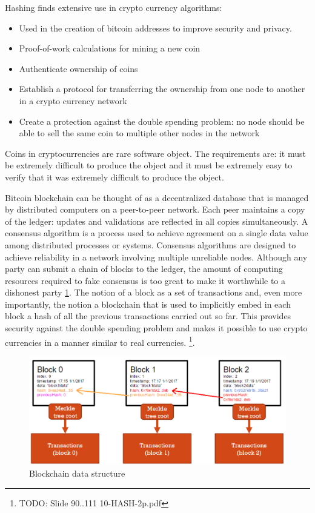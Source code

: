 Hashing finds extensive use in crypto currency algorithms:
\begin{itemize}
	\item Used in the creation of bitcoin addresses to improve security and privacy.
	\item Proof-of-work calculations for mining a new coin
	\item Authenticate ownership of coins
	\item Establish a protocol for transferring the ownership from one node to another in a crypto currency network
	\item Create a protection against the double spending problem: no node should be able to sell the same coin to multiple other nodes in the network
\end{itemize}

Coins in cryptocurrencies are rare software object. The requirements are:
it must be extremely difficult to produce the object and it must be extremely easy to verify that it was extremely difficult to produce the object.

Bitcoin blockchain can be thought of as a decentralized database that is managed by distributed computers on a peer-to-peer network. Each peer maintains a copy of the ledger: updates and validations are reflected in all copies simultaneously.  A consensus algorithm is a process used to achieve agreement on a single data value among distributed processes or systems. Consensus algorithms are designed to achieve reliability in a network involving multiple unreliable nodes. Although any party can submit a chain of blocks to the ledger, the amount of computing resources required to fake consensus is too great to make it worthwhile to a dishonest party \ref{fig:blockchain}. 
The notion of a block as a set of transactions and, even more importantly, the notion a blockchain that is used to implicitly embed in each block a hash of all the previous transactions carried out so far. This provides security against the double spending problem and makes it possible to use crypto currencies in a manner similar to real currencies.  \footnote{TODO: Slide 90..111 10-HASH-2p.pdf}.

\begin{figure}
	\centering
	\includegraphics[width=0.7\linewidth]{Images/Chapter6/blockchain}
	\caption{Blockchain data structure}
	\label{fig:blockchain}
\end{figure}




